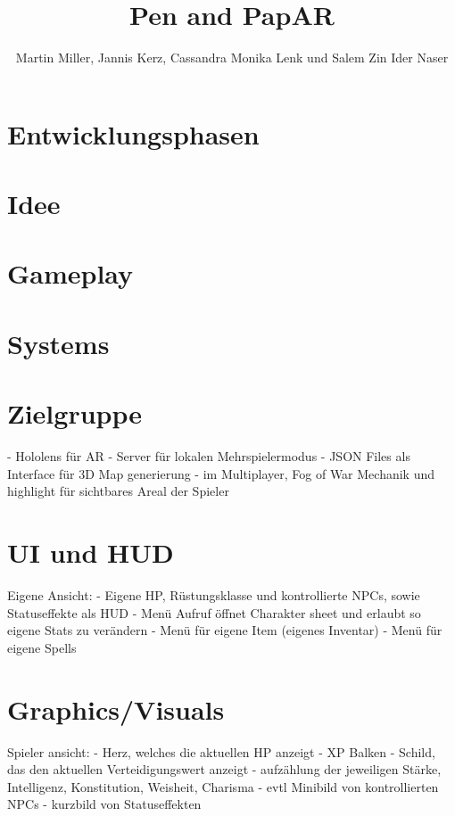 \documentclass[11pt]{article}
\begin{document}
    \title{Pen and PapAR}
    \author{Martin Miller, Jannis Kerz, Cassandra Monika Lenk und Salem Zin Ider Naser}

    \maketitle
    \newpage

    \tableofcontents
    \newpage

    \section{Entwicklungsphasen}\label{sec:chapter_dev_process}
    

    \section{Idee}\label{sec:chapter_idea}
    

    \section{Gameplay}\label{sec:chapter_gameplay}
    

    \section{Systems}\label{sec:chapter_systems}
    

    \section{Zielgruppe}\label{sec:chapter_crowd}

    - Hololens für AR
    - Server für lokalen Mehrspielermodus
    - JSON Files als Interface für 3D Map generierung
    - im Multiplayer, Fog of War Mechanik und highlight für sichtbares Areal der Spieler

    \section{UI und HUD}\label{sec:ui-und-hud}
    Eigene Ansicht:
    - Eigene HP, Rüstungsklasse und kontrollierte NPCs, sowie Statuseffekte als HUD
    - Menü Aufruf öffnet Charakter sheet und erlaubt so eigene Stats zu verändern
    - Menü für eigene Item (eigenes Inventar)
    - Menü für eigene Spells

    \section{Graphics/Visuals}\label{sec:graphics/visuals}
    Spieler ansicht:
    - Herz, welches die aktuellen HP anzeigt
    - XP Balken
    - Schild, das den aktuellen Verteidigungswert anzeigt
    - aufzählung der jeweiligen Stärke, Intelligenz, Konstitution, Weisheit, Charisma
    - evtl Minibild von kontrollierten NPCs
    - kurzbild von Statuseffekten
\end{document}
